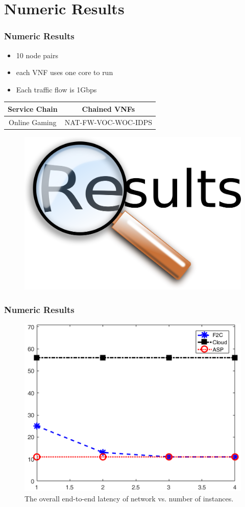 \documentclass{beamer}
\begin{document}
\section{Numeric Results}
\begin{frame}
\frametitle{Numeric Results}
\begin{itemize}
	\item {10 node pairs}
	\item {each VNF uses one core to run}
	\item {Each traffic	flow is 1Gbps} 
\end{itemize}	
	\begin{table}
		\begin{tabular}{|c|c|}
			\toprule
			\textbf{Service Chain} & \textbf{Chained VNFs}\\
			\midrule
			Online Gaming&NAT-FW-VOC-WOC-IDPS\\
			\hline
		\end{tabular}
	\end{table}

\begin{figure}
	\centering
	\includegraphics[width=0.6\linewidth]{results}
	\label{fig:results}
\end{figure}
\end{frame}
\begin{frame}
	\frametitle{Numeric Results}
	
\begin{figure}
	\centering
	\includegraphics[width=0.6\linewidth]{Result}
	\caption{The overall end-to-end latency of network vs. number of instances.}
	\label{fig:result}
\end{figure}
\end{frame}
\end{document}
